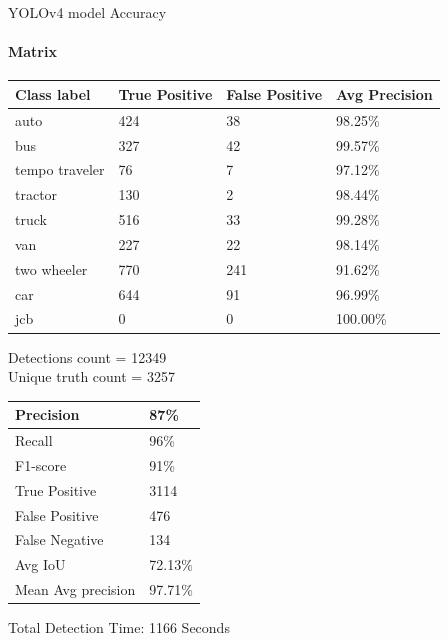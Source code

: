 \documentclass{beamer}
\begin{document}
	\begin{frame}[allowframebreaks]{YOLOv4 model Accuracy}
		\framesubtitle{Matrix}
		\begin{table}[]
			\begin{tabular}{|l|l|l|l|}
				\hline
				Class label    & True Positive & False Positive & Avg Precision \\ \hline
				auto           & 424           & 38             & 98.25\%       \\ \hline
				bus            & 327           & 42             & 99.57\%       \\ \hline
				tempo traveler & 76            & 7              & 97.12\%       \\ \hline
				tractor        & 130           & 2              & 98.44\%       \\ \hline
				truck          & 516           & 33             & 99.28\%       \\ \hline
				van            & 227           & 22             & 98.14\%       \\ \hline
				two wheeler    & 770           & 241            & 91.62\%       \\ \hline
				car            & 644           & 91             & 96.99\%       \\ \hline
				jcb            & 0             & 0              & 100.00\%      \\ \hline
			\end{tabular}
		\end{table}
		Detections count = 12349 \\
		Unique truth count = 3257
		\newpage
		
		\begin{table}[]
			\begin{tabular}{|l|l|}
				\hline
				Precision          & 87\%    \\ \hline
				Recall             & 96\%    \\ \hline
				F1-score           & 91\%    \\ \hline
				True Positive      & 3114    \\ \hline
				False Positive     & 476     \\ \hline
				False Negative     & 134     \\ \hline
				Avg IoU            & 72.13\% \\ \hline
				Mean Avg precision & 97.71\% \\ \hline
			\end{tabular}
		\end{table}
		Total Detection Time: 1166 Seconds
	\end{frame}
\end{document}
